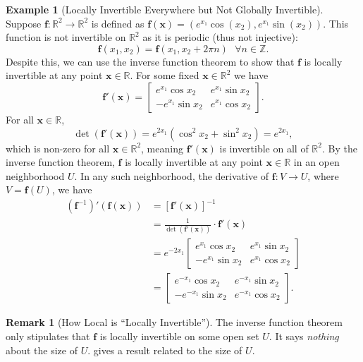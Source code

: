 \documentclass{article}
\newcommand{\R}{\mathbb{R}}
\newcommand{\x}{\mathbf{x}}
\newcommand{\f}{\mathbf{f}}
\newcommand{\Z}{\mathbb{Z}}
\theoremstyle{definition}
\newtheorem{example}{Example}[section]
\newtheorem{remark}{Remark}[section]
\begin{document}
	\begin{example}[Locally Invertible Everywhere but Not Globally Invertible]
		Suppose $ \f:\R^2\to\R^2 $ is defined as $ \f(\x)=(e^{x_1}\cos(x_2),e^{x_1}\sin(x_2)) $. This function is not invertible on $ \R^2 $ as it is periodic (thus not injective):
		$$ \f(x_1,x_2) = \f(x_1, x_2+2\pi n)\ \ \ \forall n\in \Z.$$ Despite this, we can use the inverse function theorem to show that $ \f $ is locally invertible at any point $ \x\in \R $. For some fixed $ \x\in \R^2 $ we have $$ \f'(\x)=\begin{bmatrix}
			e^{x_1}\cos x_2 & e^{x_1}\sin x_2 \\
			-e^{x_1}\sin x_2 & e^{x_1}\cos x_2
		\end{bmatrix}. $$ For all $ \x\in\R $, $$ \det(\f'(\x)) = e^{2x_1}(\cos^2x_2 + \sin^2x_2)= e^{2x_1} ,$$ which is non-zero for all $ \x\in \R^2 $, meaning $ \f'(\x) $ is invertible on all of $ \R^2 $. By the inverse function theorem, $ \f $ is locally invertible at any point $ \x\in \R $ in an open neighborhood $ U $. In any such neighborhood, the derivative of $ \f:V\to U $, where $ V=\f(U) $, we have 
		\begin{align*}
			(\f^{-1})'(\f(\x)) &= [\f'(\x)]^{-1}\\
			& =\frac{1}{\det(\f'(\x))}\cdot \f'(\x)\\
			& = e^{-2x_1}\begin{bmatrix}
				e^{x_1}\cos x_2 & e^{x_1}\sin x_2 \\
				-e^{x_1}\sin x_2 & e^{x_1}\cos x_2
			\end{bmatrix}\\
			& = \begin{bmatrix}
				e^{-x_1}\cos x_2 & e^{-x_1}\sin x_2 \\
				-e^{-x_1}\sin x_2 & e^{-x_1}\cos x_2
			\end{bmatrix}.
		\end{align*}
	\end{example}
	\begin{remark}[How Local is ``Locally Invertible'']
		The inverse function theorem only stipulates that $ \f $ is locally invertible on some open set $ U $. It says \textit{nothing} about the size of $ U $. \cite{lang2012real} gives a result related to the size of $ U $.  
	\end{remark}
\end{document}
